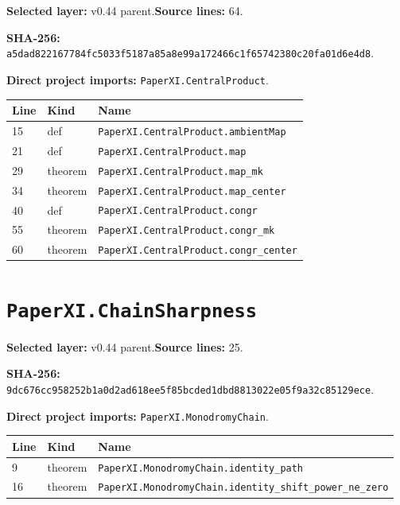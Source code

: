 \documentclass[10pt,oneside]{book}
\begin{document}
\textbf{Selected layer:} v0.44 parent.\quad\textbf{Source lines:} 64.\par\textbf{SHA-256:} {\scriptsize\nolinkurl{a5dad822167784fc5033f5187a85a8e99a172466c1f65742380c20fa01d6e4d8}}.


\textbf{Direct project imports:} \nolinkurl{PaperXI.CentralProduct}.

\begin{longtable}{@{}p{}p{}p{}@{}}\toprule Line&Kind&Name\\\midrule\endhead

15&def&\nolinkurl{PaperXI.CentralProduct.ambientMap}\\

21&def&\nolinkurl{PaperXI.CentralProduct.map}\\

29&theorem&\nolinkurl{PaperXI.CentralProduct.map_mk}\\

34&theorem&\nolinkurl{PaperXI.CentralProduct.map_center}\\

40&def&\nolinkurl{PaperXI.CentralProduct.congr}\\

55&theorem&\nolinkurl{PaperXI.CentralProduct.congr_mk}\\

60&theorem&\nolinkurl{PaperXI.CentralProduct.congr_center}\\

\bottomrule\end{longtable}

\section{\texorpdfstring{\nolinkurl{PaperXI.ChainSharpness}}{PaperXI.ChainSharpness}}\label{module:PaperXI.ChainSharpness}

\textbf{Selected layer:} v0.44 parent.\quad\textbf{Source lines:} 25.\par\textbf{SHA-256:} {\scriptsize\nolinkurl{9dc676cc958252b1a0d2ad618ee5f85bcded1dbd8813022e05f9a32c85129ece}}.

\textbf{Direct project imports:} \nolinkurl{PaperXI.MonodromyChain}.

\begin{longtable}{@{}p{}p{}p{}@{}}\toprule Line&Kind&Name\\\midrule\endhead

9&theorem&\nolinkurl{PaperXI.MonodromyChain.identity_path}\\

16&theorem&\nolinkurl{PaperXI.MonodromyChain.identity_shift_power_ne_zero}\\

\bottomrule\end{longtable}
\end{document}
